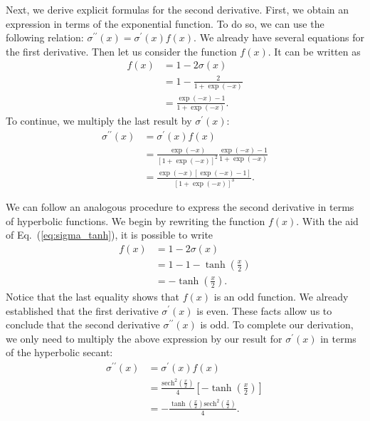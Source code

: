 \documentclass[10pt,american]{scrartcl}
\begin{document}
Next, we derive explicit formulas for the second derivative. First, we obtain
an expression in terms of the exponential function. To do so, we can use the
following relation:
$\sigma^{\prime\prime}\left(x\right)=\sigma^{\prime}\left(x\right)f\left(x\right)$.
We already have several equations for the first derivative. Then let us
consider the function $f\left(x\right)$. It can be written as
\begin{align}
\nonumber f\left(x\right)&=1-2\sigma\left(x\right)\\
\nonumber&=1-\frac{2}{1+\exp\left(-x\right)}\\
&=\frac{\exp\left(-x\right)-1}{1+\exp\left(-x\right)}.
\end{align}
To continue, we multiply the last result by $\sigma^{\prime}\left(x\right)$:
\begin{align}
\nonumber\sigma^{\prime\prime}\left(x\right)&=\sigma^{\prime}\left(x\right)f\left(x\right)\\
\nonumber&=\frac{\exp\left(-x\right)}{\left[1+\exp\left(-x\right)\right]^{2}}\frac{\exp\left(-x\right)-1}{1+\exp\left(-x\right)}\\
&=\frac{\exp\left(-x\right)\left[\exp\left(-x\right)-1\right]}{\left[1+\exp\left(-x\right)\right]^{3}}.
\end{align}

We can follow an analogous procedure to express the second derivative in terms
of hyperbolic functions. We begin by rewriting the function $f\left(x\right)$.
With the aid of Eq.~(\ref{eq:sigma_tanh}), it is possible to write
\begin{align}
\nonumber f\left(x\right)&=1-2\sigma\left(x\right)\\
\nonumber&=1-1-\tanh\left(\frac{x}{2}\right)\\
&=-\tanh\left(\frac{x}{2}\right).
\end{align}
Notice that the last equality shows that $f\left(x\right)$ is an odd function.
We already established that the first derivative
$\sigma^{\prime}\left(x\right)$ is even. These facts allow us to conclude that
the second derivative $\sigma^{\prime\prime}\left(x\right)$ is odd.
To complete our derivation, we only need to multiply the above expression by
our result for $\sigma^{\prime}\left(x\right)$ in terms of the hyperbolic
secant:
\begin{align}
\nonumber\sigma^{\prime\prime}\left(x\right)&=\sigma^{\prime}\left(x\right)f\left(x\right)\\
\nonumber&=\frac{\mathrm{sech}^{2}\left(\frac{x}{2}\right)}{4}\left[-\tanh\left(\frac{x}{2}\right)\right]\\
&=-\frac{\tanh\left(\frac{x}{2}\right)\mathrm{sech}^{2}\left(\frac{x}{2}\right)}{4}.
\end{align}
\end{document}
